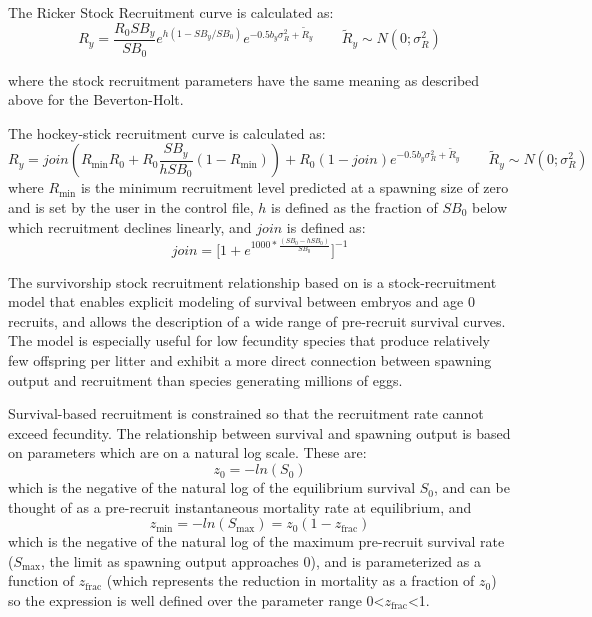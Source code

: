 \hypertarget{Ricker}{}
The Ricker Stock Recruitment curve is calculated as:
\begin{equation}{R_y = \frac{R_0SB_y}{SB_0}e^{h(1-SB_y/SB_0)}e^{-0.5b_y\sigma^2_R+\tilde{R}_y}\qquad  \tilde{R}_y\sim N(0;\sigma^2_R)}
\end{equation}

where the stock recruitment parameters have the same meaning as described above for the Beverton-Holt.

\hypertarget{Hockey}{}
The hockey-stick recruitment curve is calculated as:
\begin{equation}{R_y = join(R_{\text{min}}R_0+R_0\frac{SB_y}{hSB_0}(1-R_{\text{min}}))+R_0(1-join)e^{-0.5b_y\sigma^2_R+\tilde{R}_y}\qquad  \tilde{R}_y\sim N(0;\sigma^2_R)}\end{equation}
where $R_{\text{min}}$ is the minimum recruitment level predicted at a spawning size of zero and is set by the user in the control file, $h$ is defined as the fraction of $SB_0$ below which recruitment declines linearly, and $join$ is defined as:
\begin{equation}{ join = \bigg[1+e^{1000*\frac{(SB_0-hSB_0)}{SB_0}}\bigg]^{-1} } \end{equation}

\hypertarget{Survivorship}{}
The survivorship stock recruitment relationship based on \citet{taylor-stockrecruitment-2013} is a stock-recruitment model that enables explicit modeling of survival between embryos and age 0 recruits, and allows the description of a wide range of pre-recruit survival curves. The model is especially useful for low fecundity species that produce relatively few offspring per litter and exhibit a more direct connection between spawning output and recruitment than species generating millions of eggs.

Survival-based recruitment is constrained so that the recruitment rate cannot exceed fecundity. The relationship between survival and spawning output is based on parameters which are on a natural log scale. These are:
\begin{equation}
z_0=-ln(S_0)
\end{equation} 
which is the negative of the natural log of the equilibrium survival $S_0$, and can be thought of as a pre-recruit instantaneous mortality rate at equilibrium, and
\begin{equation}
z_{\text{min}}=-ln(S_{\text{max}})=z_0(1-z_{\text{frac}})
\end{equation}
which is the negative of the natural log of the maximum pre-recruit survival rate ($S_{\text{max}}$, the limit as spawning output approaches 0), and is parameterized as a function of $z_{\text{frac}}$ (which represents the reduction in mortality as a fraction of $z_0$) so the expression is well defined over the parameter range 0<$z_{\text{frac}}$<1.

